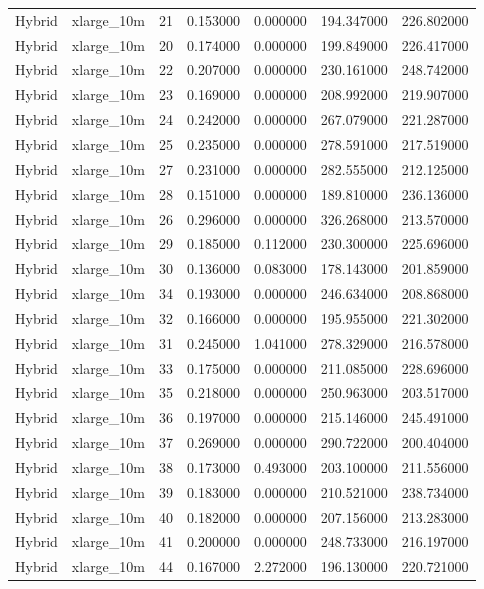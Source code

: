 \begin{tabular}{llrrrrr}
Hybrid & xlarge_10m & 21 & 0.153000 & 0.000000 & 194.347000 & 226.802000 \\
Hybrid & xlarge_10m & 20 & 0.174000 & 0.000000 & 199.849000 & 226.417000 \\
Hybrid & xlarge_10m & 22 & 0.207000 & 0.000000 & 230.161000 & 248.742000 \\
Hybrid & xlarge_10m & 23 & 0.169000 & 0.000000 & 208.992000 & 219.907000 \\
Hybrid & xlarge_10m & 24 & 0.242000 & 0.000000 & 267.079000 & 221.287000 \\
Hybrid & xlarge_10m & 25 & 0.235000 & 0.000000 & 278.591000 & 217.519000 \\
Hybrid & xlarge_10m & 27 & 0.231000 & 0.000000 & 282.555000 & 212.125000 \\
Hybrid & xlarge_10m & 28 & 0.151000 & 0.000000 & 189.810000 & 236.136000 \\
Hybrid & xlarge_10m & 26 & 0.296000 & 0.000000 & 326.268000 & 213.570000 \\
Hybrid & xlarge_10m & 29 & 0.185000 & 0.112000 & 230.300000 & 225.696000 \\
Hybrid & xlarge_10m & 30 & 0.136000 & 0.083000 & 178.143000 & 201.859000 \\
Hybrid & xlarge_10m & 34 & 0.193000 & 0.000000 & 246.634000 & 208.868000 \\
Hybrid & xlarge_10m & 32 & 0.166000 & 0.000000 & 195.955000 & 221.302000 \\
Hybrid & xlarge_10m & 31 & 0.245000 & 1.041000 & 278.329000 & 216.578000 \\
Hybrid & xlarge_10m & 33 & 0.175000 & 0.000000 & 211.085000 & 228.696000 \\
Hybrid & xlarge_10m & 35 & 0.218000 & 0.000000 & 250.963000 & 203.517000 \\
Hybrid & xlarge_10m & 36 & 0.197000 & 0.000000 & 215.146000 & 245.491000 \\
Hybrid & xlarge_10m & 37 & 0.269000 & 0.000000 & 290.722000 & 200.404000 \\
Hybrid & xlarge_10m & 38 & 0.173000 & 0.493000 & 203.100000 & 211.556000 \\
Hybrid & xlarge_10m & 39 & 0.183000 & 0.000000 & 210.521000 & 238.734000 \\
Hybrid & xlarge_10m & 40 & 0.182000 & 0.000000 & 207.156000 & 213.283000 \\
Hybrid & xlarge_10m & 41 & 0.200000 & 0.000000 & 248.733000 & 216.197000 \\
Hybrid & xlarge_10m & 44 & 0.167000 & 2.272000 & 196.130000 & 220.721000 \\

\end{tabular}
